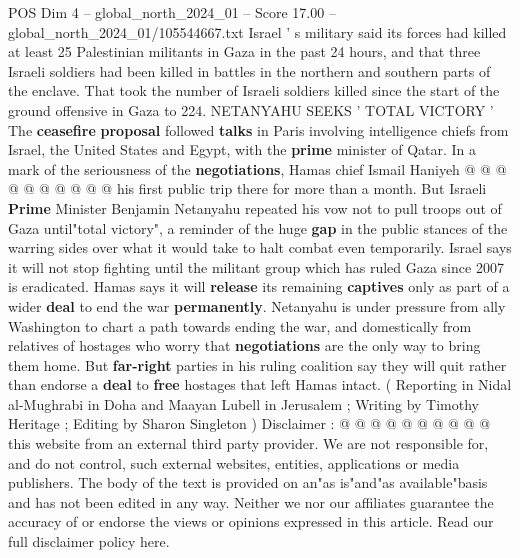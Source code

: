 \begin{textsample}{POS Dim 4 – global\_north\_2024\_01 – Score 17.00 – global\_north\_2024\_01/105544667.txt}
Israel ' s military said its forces had killed at least 25 Palestinian militants in Gaza in the past 24 hours, and that three Israeli soldiers had been killed in battles in the northern and southern parts of the enclave.
That took the number of Israeli soldiers killed since the start of the ground offensive in Gaza to 224.
NETANYAHU SEEKS ' TOTAL VICTORY ' The \textbf{ceasefire} \textbf{proposal} followed \textbf{talks} in Paris involving intelligence chiefs from Israel, the United States and Egypt, with the \textbf{prime} minister of Qatar.
In a mark of the seriousness of the \textbf{negotiations}, Hamas chief Ismail Haniyeh @ @ @ @ @ @ @ @ @ @ his first public trip there for more than a month.
But Israeli \textbf{Prime} Minister Benjamin Netanyahu repeated his vow not to pull troops out of Gaza until"total victory", a reminder of the huge \textbf{gap} in the public stances of the warring sides over what it would take to halt combat even temporarily.
Israel says it will not stop fighting until the militant group which has ruled Gaza since 2007 is eradicated.
Hamas says it will \textbf{release} its remaining \textbf{captives} only as part of a wider \textbf{deal} to end the war \textbf{permanently}.
Netanyahu is under pressure from ally Washington to chart a path towards ending the war, and domestically from relatives of hostages who worry that \textbf{negotiations} are the only way to bring them home.
But \textbf{far-right} parties in his ruling coalition say they will quit rather than endorse a \textbf{deal} to \textbf{free} hostages that left Hamas intact. ( Reporting in Nidal al-Mughrabi in Doha and Maayan Lubell in Jerusalem ; Writing by Timothy Heritage ; Editing by Sharon Singleton ) Disclaimer : @ @ @ @ @ @ @ @ @ @ this website from an external third party provider.
We are not responsible for, and do not control, such external websites, entities, applications or media publishers.
The body of the text is provided on an"as is"and"as available"basis and has not been edited in any way.
Neither we nor our affiliates guarantee the accuracy of or endorse the views or opinions expressed in this article.
Read our full disclaimer policy here.

\end{textsample}
